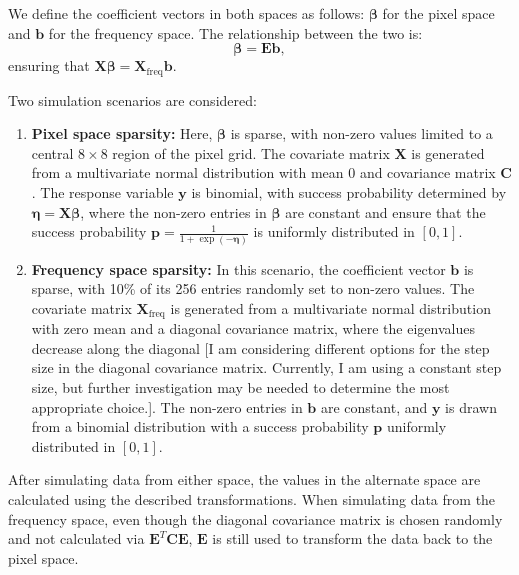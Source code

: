 \documentclass[12pt]{article}
\begin{document}
We define the coefficient vectors in both spaces as follows: \( \boldsymbol{\beta} \) for the pixel space and \( \mathbf{b} \) for the frequency space. The relationship between the two is:
\[
\boldsymbol{\beta} = \mathbf{E} \mathbf{b},
\]
ensuring that \( \mathbf{X} \boldsymbol{\beta} = \mathbf{X}_{\mathrm{freq}} \mathbf{b} \).

Two simulation scenarios are considered:
\begin{enumerate}
  \item \textbf{Pixel space sparsity:} Here, \( \boldsymbol{\beta} \) is sparse, with non-zero values limited to a central \( 8 \times 8 \) region of the pixel grid. The covariate matrix \( \mathbf{X} \) is generated from a multivariate normal distribution with mean 0 and covariance matrix \( \mathbf{C} \). The response variable \( \mathbf{y} \) is binomial, with success probability determined by \( \boldsymbol{\eta} = \mathbf{X} \boldsymbol{\beta} \), where the non-zero entries in \( \boldsymbol{\beta} \) are constant and ensure that the success probability \( \mathbf{p} = \frac{1}{1 + \exp(-\boldsymbol{\eta})} \) is uniformly distributed in \( [0, 1] \).
  
  \item \textbf{Frequency space sparsity:} In this scenario, the coefficient vector \( \mathbf{b} \) is sparse, with 10\% of its 256 entries randomly set to non-zero values. The covariate matrix \( \mathbf{X}_{\mathrm{freq}} \) is generated from a multivariate normal distribution with zero mean and a diagonal covariance matrix, where the eigenvalues decrease along the diagonal [I am considering different options for the step size in the diagonal covariance matrix. Currently, I am using a constant step size, but further investigation may be needed to determine the most appropriate choice.]. The non-zero entries in \( \mathbf{b} \) are constant, and \( \mathbf{y} \) is drawn from a binomial distribution with a success probability \( \mathbf{p} \) uniformly distributed in \( [0, 1] \).

\end{enumerate}

After simulating data from either space, the values in the alternate space are calculated using the described transformations. When simulating data from the frequency space, even though the diagonal covariance matrix is chosen randomly and not calculated via \( \mathbf{E}^T \mathbf{C} \mathbf{E} \), \( \mathbf{E} \) is still used to transform the data back to the pixel space.
\end{document}
